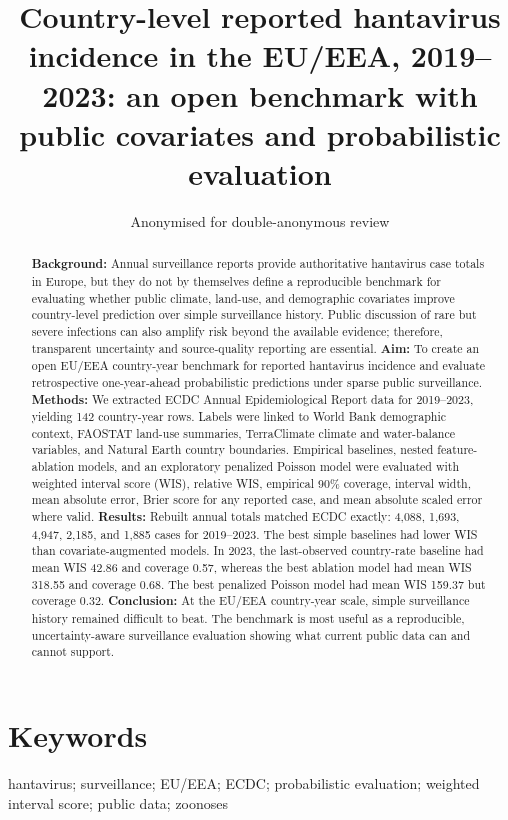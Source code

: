 \documentclass[11pt]{article}
\title{Country-level reported hantavirus incidence in the EU/EEA, 2019--2023: an open benchmark with public covariates and probabilistic evaluation}
\author{Anonymised for double-anonymous review}
\date{}
\begin{document}
\maketitle

\begin{abstract}
\textbf{Background:} Annual surveillance reports provide authoritative hantavirus case totals in Europe, but they do not by themselves define a reproducible benchmark for evaluating whether public climate, land-use, and demographic covariates improve country-level prediction over simple surveillance history. Public discussion of rare but severe infections can also amplify risk beyond the available evidence; therefore, transparent uncertainty and source-quality reporting are essential.
\textbf{Aim:} To create an open EU/EEA country-year benchmark for reported hantavirus incidence and evaluate retrospective one-year-ahead probabilistic predictions under sparse public surveillance.
\textbf{Methods:} We extracted ECDC Annual Epidemiological Report data for 2019--2023, yielding 142 country-year rows. Labels were linked to World Bank demographic context, FAOSTAT land-use summaries, TerraClimate climate and water-balance variables, and Natural Earth country boundaries. Empirical baselines, nested feature-ablation models, and an exploratory penalized Poisson model were evaluated with weighted interval score (WIS), relative WIS, empirical 90\% coverage, interval width, mean absolute error, Brier score for any reported case, and mean absolute scaled error where valid.
\textbf{Results:} Rebuilt annual totals matched ECDC exactly: 4,088, 1,693, 4,947, 2,185, and 1,885 cases for 2019--2023. The best simple baselines had lower WIS than covariate-augmented models. In 2023, the last-observed country-rate baseline had mean WIS 42.86 and coverage 0.57, whereas the best ablation model had mean WIS 318.55 and coverage 0.68. The best penalized Poisson model had mean WIS 159.37 but coverage 0.32.
\textbf{Conclusion:} At the EU/EEA country-year scale, simple surveillance history remained difficult to beat. The benchmark is most useful as a reproducible, uncertainty-aware surveillance evaluation showing what current public data can and cannot support.
\end{abstract}

\section*{Keywords}
hantavirus; surveillance; EU/EEA; ECDC; probabilistic evaluation; weighted interval score; public data; zoonoses
\end{document}

